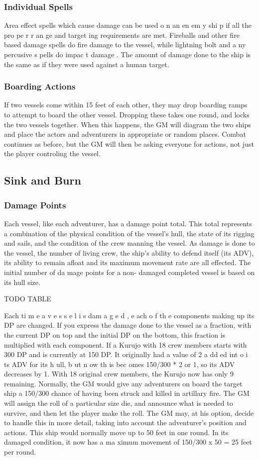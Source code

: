 \begin{multicols*}{2}
\subsubsection{Individual Spells}
Area effect spells which cause damage can be used
o n an en em y shi p if all the pro pe r r an ge and target ing
requirements are met. Fireballs and other fire based damage
spells do fire damage to the vessel, while lightning bolt and
a ny percusive s pells do impac t damage . The amount of
damage done to the ship is the same as if they were used
against a human target.
\subsubsection{Boarding Actions}
If two vessels come within 15 feet of each other,
they may drop boarding ramps to attempt to board the other
vessel. Dropping these takes one round, and locks the two
vessels together. When this happens, the GM will diagram the
two ships and place the actors and adventurers in appropriate
or random places. Combat continues as before, but the GM
will then be asking everyone for actions, not just the player
controling the vessel.
\subsection{Sink and Burn}
\subsubsection{Damage Points}
Each vessel, like each adventurer, has a damage
point total. This total represents a combination of the physical
condition of the vessel's hull, the state of its rigging and sails,
and the condition of the crew manning the vessel. As damage
is done to the vessel, the number of living crew, the ship's
ability to defend itself (its ADV), its ability to remain afloat
and its maximum movement rate are all effected.
The initial number of da mage points for a non-
damaged completed vessel is based on its hull size.

TODO TABLE 

Each ti m e a v e s s e l i s dam a g e d , e ach o f th e
components making up its DP are changed. If you express the
damage done to the vessel as a fraction, with the current DP
on top and the initial DP on the bottom, this fraction is
multiplied with each component.
If a Kurujo with 18 crew members starts with 300
DP and is currently at 150 DP. It originally had a value of 2
a dd ed int o i ts ADV for its h ull, b ut n ow th is bec omes
150/300 * 2 or 1, so its ADV decreases by 1.
With 18 original crew members, the Kurujo now
has only 9 remaining. Normally, the GM would give any
adventurers on board the target ship a 150/300 chance of
having been struck and killed in artillary fire. The GM will
assign the roll of a particular size die, and announce what is
needed to survive, and then let the player make the roll. The
GM may, at his option, decide to handle this in more detail,
taking into account the adventurer's position and actions.
This ship would normally move up to 50 feet in one
round. In its damaged condition, it now has a ma ximum
movement of 150/300 x 50 = 25 feet per round.

\end{multicols*}
